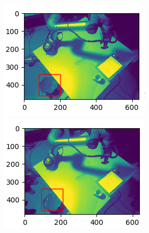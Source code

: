 \begin{figure}
\centering
\begin{minipage}[t]{.33\textwidth}
\centering
\vspace{0pt}
\includegraphics[width=\linewidth]{./images/tb1.png}
\end{minipage}\hfill
\begin{minipage}[t]{.33\textwidth}
\centering
\vspace{0pt}
\includegraphics[width=\linewidth]{./images/tb2.png}
\end{minipage}\hfill
\begin{minipage}[t]{.33\textwidth}

\end{minipage}
\end{figure}

